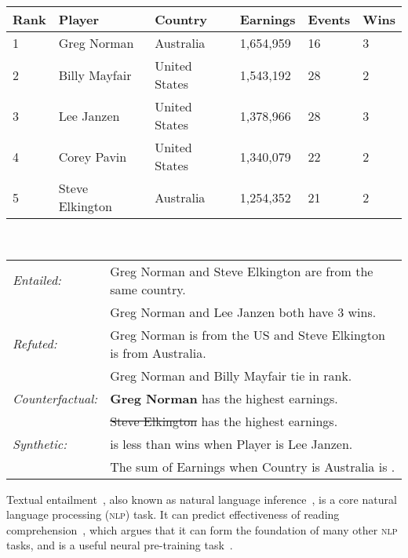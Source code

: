 \documentclass[11pt,a4paper]{article}
\newcommand{\abr}[1]{\textsc{#1}}
\newcommand{\tabfact}{\textsc{TabFact}\xspace}
\newcommand{\editout}[1]{{\color{red} \sout{#1}}}
\newcommand{\editin}[1]{{\color{darkgreen} \textbf{#1}}}
\theoremstyle{definition}
\begin{document}
\begin{figure*}[!t]
\centering
\begin{tabular}{llllll}
\textbf{Rank} &	\textbf{Player} & \textbf{Country} & \textbf{Earnings} & \textbf{Events} & \textbf{Wins} \\
\hline
1	&Greg Norman    &	Australia    &	1,654,959&	16&	3 \\
2	&Billy Mayfair  &	United States&	1,543,192&	28&	2 \\
3	&Lee Janzen     &	United States&	1,378,966&	28&	3 \\
4	&Corey Pavin    &	United States&	1,340,079&	22&	2 \\
5	&Steve Elkington&	Australia    &	1,254,352&	21&	2 \\
\end{tabular}\\
\vspace{12pt}
\begin{tabular}{ll}
{\small \emph{Entailed:}} &{\small Greg Norman and Steve Elkington are from the same country. }\\
                         &{\small Greg Norman and Lee Janzen both have 3 wins.}\\

{\small \emph{Refuted:}}  &{\small Greg Norman is from the US and Steve Elkington is from Australia. }\\
                         &{\small Greg Norman and Billy Mayfair tie in rank.}\\

{\small \emph{Counterfactual:}} & {\small \editin{Greg Norman} has the highest earnings.}\\
                                & {\small \editout{Steve Elkington} has the highest earnings.}\\
{\small\emph{Synthetic:}}&{\small  is less than wins when Player is Lee Janzen.}\\
&{\small The sum of Earnings when Country is Australia is .}\\
\end{tabular}\caption{A \tabfact{} table with real statements\footnotemark and counterfactual and synthetic examples.}
\label{fig:example}
\end{figure*}

Textual entailment~\cite{dagan2005pascal}, also known as natural language inference~\cite{bowman-etal-2015-large}, is a core natural language processing (\abr{nlp}) task.
It can predict effectiveness of reading comprehension~\cite{dagan-10}, which argues that it can form the foundation of many other \abr{nlp} tasks, and is a useful neural pre-training task~\cite{subramanian2018learning,conneau-etal-2017-supervised}.
\end{document}
